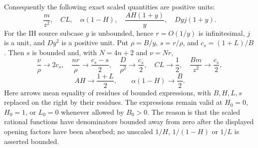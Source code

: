 Consequently the following exact scaled quantities are positive units:
\[
 \frac m{z^2},\quad CL,\quad\alpha(1-H),\quad
 \frac{AH(1+y)}y,\quad Dyj(1+y).
\tag{GE2}
\]
For the IH source subcase $y$ is unbounded, hence $r=O(1/y)$ is
infinitesimal, $j$ is a unit, and $Dy^2$ is a positive unit.
Put $\rho=B/y$, $s=r/\rho$, and $c_s=(1+L)/B$.
Then $s$ is bounded and, with $N=4n+2$ and $\nu=Nr$,
\[
 \frac\nu\rho\longrightarrow2c_s,\quad
 \frac{nr}\rho\longrightarrow\frac{c_s-s}{2},\quad
 \frac D{\rho^2}\longrightarrow\frac{c_s}{2},\quad
 CL\longrightarrow\frac12,\quad
 \frac{Bm}{z^2}\longrightarrow\frac{c_s}{2},
\]
\[
 AH\longrightarrow\frac{1+L}{2},\qquad
 \alpha(1-H)\longrightarrow\frac B2.
\tag{GE3}
\]
Here arrows mean equality of residues of bounded expressions, with
$B,H,L,s$ replaced on the right by their residues. The expressions
remain valid at $H_0=0$, $H_0=1$, or $L_0=0$ whenever allowed by $B_0>0$.
The reason is that the scaled rational functions have denominators
bounded away from zero after the displayed opening factors have
been absorbed; no unscaled $1/H$, $1/(1-H)$ or $1/L$ is asserted bounded.
